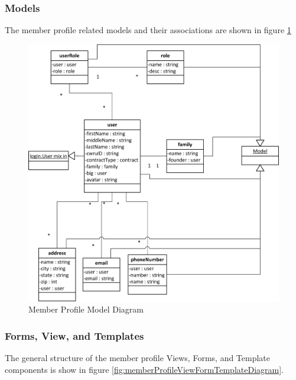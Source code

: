 \documentclass{article}
\begin{document}
\subsubsection{Models}

The member profile related models and their associations are shown in figure \ref{fig:memberProfileModelDiagram}

\FloatBarrier
\begin{figure}[h!]
\centering
\includegraphics[scale=.65]{img/modelDiagrams/userModel}
\caption{Member Profile Model Diagram}
\label{fig:memberProfileModelDiagram}
\end{figure}
\FloatBarrier

\subsubsection{Forms, View, and Templates}

The general structure of the member profile Views, Forms, and Template components is show in figure \ref{fig:memberProfileViewFormTemplateDiagram}.
\end{document}
